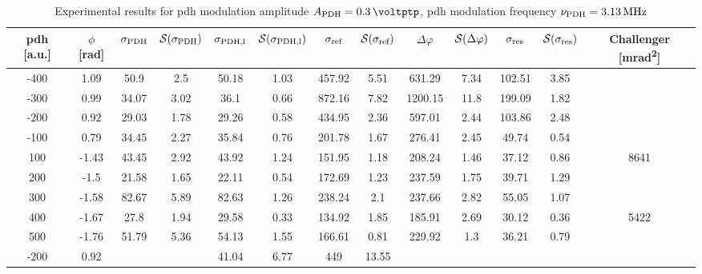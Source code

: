 \begin{landscape}
	
	\begin{table}
	\centering
	\begin{tabular}{|c|c|c|c|c|c|c|c|c|c|c|c|c|}
		\hline
		\gls{pdh} [a.u.] & $\phi$ [\si{\radian}] & $\sigma_{\text{PDH}}$ & $\mathcal{S}(\sigma_{\text{PDH}})$ & $\sigma_{\text{PDH,l}}$ & $\mathcal{S}(\sigma_{\text{PDH,l}})$  & $\sigma_{\text{ref}}$ & $\mathcal{S}(\sigma_{\text{ref}})$ & $\Delta \varphi$ & $\mathcal{S}(\Delta \varphi)$ & $\sigma_{\text{res}}$  & $\mathcal{S}(\sigma_{\text{res}})$ & Challenger [\si{\milli\radian\squared}] \\
		\hline
		\hline
		-400 & 1.09 & 50.9 & 2.5 & 50.18 & 1.03 & 457.92 & 5.51 & 631.29 & 7.34 & 102.51 & 3.85 & \\
		-300 & 0.99 & 34.07 & 3.02 & 36.1 & 0.66 & 872.16 & 7.82 & 1200.15 & 11.8 & 199.09 & 1.82 & \\
		-200 & 0.92 & 29.03 & 1.78 & 29.26 & 0.58 & 434.95 & 2.36 & 597.01 & 2.44 & 103.86 & 2.48 & \\
		-100 & 0.79 & 34.45 & 2.27 & 35.84 & 0.76 & 201.78 & 1.67 & 276.41 & 2.45 & 49.74 & 0.54 & \\
		100 & -1.43 & 43.45 & 2.92 & 43.92 & 1.24 & 151.95 & 1.18 & 208.24 & 1.46 & 37.12 & 0.86 & 8641\\
		200 & -1.5 & 21.58 & 1.65 & 22.11 & 0.54 & 172.69 & 1.23 & 237.59 & 1.75 & 39.71 & 1.29 & \\
		300 & -1.58 & 82.67 & 5.89 & 82.63 & 1.26 & 238.24 & 2.1 & 237.66 & 2.82 & 55.05 & 1.07 & \\
		400 & -1.67 & 27.8 & 1.94 & 29.58 & 0.33 & 134.92 & 1.85 & 185.91 & 2.69 & 30.12 & 0.36 & 5422\\
		500 & -1.76 & 51.79 & 5.36 & 54.13 & 1.55 & 166.61 & 0.81 & 229.92 & 1.3 & 36.21 & 0.79 & \\
		\hline
		\hline
		-200 & 0.92 & & & 41.04 & 6.77 & 449 & 13.55 & & & & & \\
		\hline
	\end{tabular}
	\caption{Experimental results for \gls{pdh} modulation amplitude $\tind{A}{PDH} = \SI{0.3}{\voltptp}$, \gls{pdh} modulation frequency $\nu_{\text{PDH}} = \SI{3.13}{\mega\hertz}$}
	\end{table}
	
	

\end{landscape}
